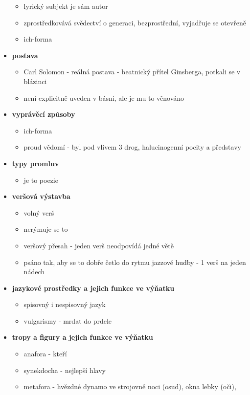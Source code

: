 \documentclass[11pt]{article}
\begin{document}
\begin{itemize}
        \begin{itemize}
            \item lyrický subjekt je sám autor
            \item zprostředkovává svědectví o generaci, bezprostřední, vyjadřuje se otevřeně
            \item ich-forma
        \end{itemize}
        \item\textbf{postava}
        \begin{itemize}
            \item Carl Solomon - reálná postava - beatnický přítel Ginsberga, potkali se v blázinci
            \item není explicitně uveden v básni, ale je mu to věnováno
        \end{itemize}
        \item\textbf{vyprávěcí způsoby}
        \begin{itemize}
            \item ich-forma
            \item proud vědomí - byl pod vlivem 3 drog, halucinogenní pocity a představy
        \end{itemize}
        \item\textbf{typy promluv}
        \begin{itemize}
            \item je to poezie
        \end{itemize}
        \item\textbf{veršová výstavba}
        \begin{itemize}
            \item volný verš
            \item nerýmuje se to
            \item veršový přesah - jeden verš neodpovídá jedné větě
            \item psáno tak, aby se to dobře četlo do rytmu jazzové hudby - 1 verš na jeden nádech
        \end{itemize}
        \item\textbf{jazykové prostředky a jejich funkce ve výňatku}
        \begin{itemize}
            \item spisovný i nespisovný jazyk
            \item vulgarismy - mrdat do prdele
        \end{itemize}
        \item\textbf{tropy a figury a jejich funkce ve výňatku}
        \begin{itemize}
            \item anafora - kteří
            \item synekdocha - nejlepší hlavy
            \item metafora - hvězdné dynamo ve strojovně noci (osud), okna lebky (oči), 
        \end{itemize}
    \end{itemize}
\end{document}

